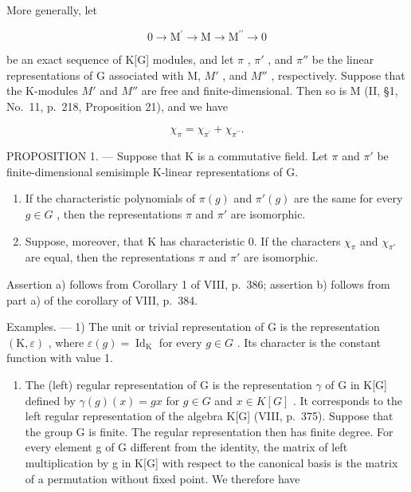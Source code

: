 More generally, let

\[
0 \longrightarrow \mathrm{M} ^ {\prime} \longrightarrow \mathrm{M} \longrightarrow \mathrm{M} ^ {\prime \prime} \longrightarrow 0
\]

be an exact sequence of K{[}G{]} modules, and let \(\pi\) , \(\pi'\) , and \(\pi''\) be the linear representations of G associated with M, \(M'\) , and \(M''\) , respectively. Suppose that the K-modules \(M'\) and \(M''\) are free and finite-dimensional. Then so is M (II, §1, No.~11, p.~218, Proposition 21), and we have

\[
\chi_ {\pi} = \chi_ {\pi^ {\prime}} + \chi_ {\pi^ {\prime \prime}}.\tag{1}
\]

PROPOSITION 1. --- Suppose that K is a commutative field. Let \(\pi\) and \(\pi'\) be finite-dimensional semisimple K-linear representations of G.

\begin{enumerate}
\def\labelenumi{\alph{enumi})}
\item
  If the characteristic polynomials of \(\pi(g)\) and \(\pi'(g)\) are the same for every \(g \in G\) , then the representations \(\pi\) and \(\pi'\) are isomorphic.
\item
  Suppose, moreover, that K has characteristic 0. If the characters \(\chi_{\pi}\) and \(\chi_{\pi'}\) are equal, then the representations \(\pi\) and \(\pi'\) are isomorphic.
\end{enumerate}

Assertion a) follows from Corollary 1 of VIII, p.~386; assertion b) follows from part a) of the corollary of VIII, p.~384.

Examples. --- 1) The unit or trivial representation of G is the representation \((\mathrm{K}, \varepsilon)\) , where \(\varepsilon(g) = \operatorname{Id}_{\mathrm{K}}\) for every \(g \in G\) . Its character is the constant function with value 1.

\begin{enumerate}
\def\labelenumi{\arabic{enumi})}
\setcounter{enumi}{1}
\tightlist
\item
  The (left) regular representation of G is the representation \(\gamma\) of G in K{[}G{]} defined by \(\gamma(g)(x)=gx\) for \(g\in G\) and \(x\in K[G]\) . It corresponds to the left regular representation of the algebra K{[}G{]} (VIII, p.~375). Suppose that the group G is finite. The regular representation then has finite degree. For every element g of G different from the identity, the matrix of left multiplication by g in K{[}G{]} with respect to the canonical basis is the matrix of a permutation without fixed point. We therefore have
\end{enumerate}

